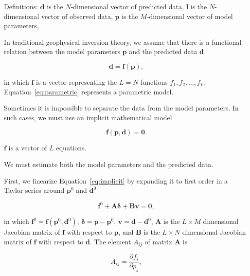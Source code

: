 \documentclass[onecolumn]{article}
\begin{document}
Definitions:
$\mathbf{d}$ is the $N$-dimensional vector of predicted data,
$\mathbf{l}$ is the $N$-dimensional vector of observed data,
$\mathbf{p}$ is the $M$-dimensional vector of model parameters,

In traditional geophysical inversion theory,
we assume that there is a functional relation between
the model parameters $\mathbf{p}$
and the predicted data $\mathbf{d}$

\begin{equation}
    \mathbf{d} = \mathbf{f}(\mathbf{p}),
    \label{eq:parametric}
\end{equation}

\noindent
in which $\mathbf{f}$ is a vector representing the $L = N$ functions
$f_1, f_2, \ldots, f_L$.
Equation~\ref{eq:parametric} represents a parametric model.



Sometimes it is impossible to separate the data from the model parameters.
In such cases,
we must use an implicit mathematical model

\begin{equation}
    \mathbf{f}(\mathbf{p}, \mathbf{d}) = \mathbf{0}.
    \label{eq:implicit}
\end{equation}

$\mathbf{f}$ is a vector of $L$ equations.

We must estimate both the model parameters and the predicted data.

First, we linearize Equation~\ref{eq:implicit} by expanding it to first order
in a Taylor series around $\mathbf{p}^0$ and $\mathbf{d}^0$

\begin{equation}
    \mathbf{f}^0 + \mathbf{A}\mathbf{\delta} + \mathbf{B}\mathbf{v} =
    \mathbf{0},
    \label{eq:implicit-taylor}
\end{equation}

\noindent
in which
$\mathbf{f}^0 = \mathbf{f}(\mathbf{p}^0, \mathbf{d}^0)$,
$\mathbf{\delta} = \mathbf{p} - \mathbf{p}^0$,
$\mathbf{v} = \mathbf{d} - \mathbf{d}^0$,
$\mathbf{A}$ is
the $L \times M$ dimensional Jacobian matrix of $\mathbf{f}$
with respect to $\mathbf{p}$,
and
$\mathbf{B}$ is
the $L \times N$ dimensional Jacobian matrix of $\mathbf{f}$
with respect to $\mathbf{d}$.
The element $A_{ij}$ of matrix $\mathbf{A}$ is

\begin{equation}
    A_{ij} = \dfrac{\partial f_i}{\partial p_j},
    \label{eq:A}
\end{equation}
\end{document}
